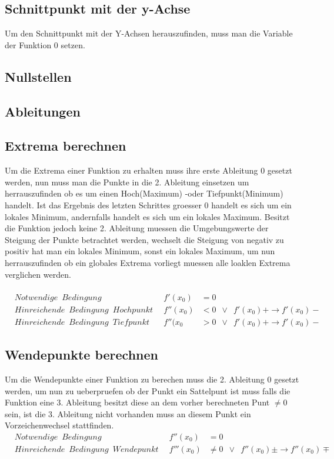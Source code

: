 \documentclass[a4paper]{article} %
\begin{document}

	\subsection{Schnittpunkt mit der y-Achse}
	Um den Schnittpunkt mit der Y-Achsen herauszufinden, muss man die Variable der Funktion 0 setzen.
	\subsection{Nullstellen}
	\subsection{Ableitungen}
	\subsection{Extrema berechnen}
	Um die Extrema einer Funktion zu erhalten muss ihre erste Ableitung $0$ gesetzt werden, nun muss man die Punkte in die 2. Ableitung 
	einsetzen um herrauszufinden ob es um einen Hoch(Maximum) -oder Tiefpunkt(Minimum) handelt. Ist das Ergebnis des letzten Schrittes groesser 0
	handelt es sich um ein lokales Minimum, andernfalls handelt es sich um ein lokales Maximum. Besitzt die Funktion jedoch keine 2. Ableitung muessen die Umgebungswerte der Steigung der Punkte betrachtet werden, wechselt die Steigung von negativ zu positiv hat man ein lokales  Minimum, sonst ein lokales Maximum, um nun herrauszufinden ob ein globales Extrema vorliegt muessen alle loaklen Extrema verglichen werden.\\\\
	\begin{align*}
		&Notwendige\enspace Bedingung\enspace &f'(x_0)&=0\\
		&Hinreichende\enspace Bedingung\enspace Hochpunkt\enspace &f''(x_0)&<0\enspace \lor \enspace f'(x_0)+\rightarrow f'(x_0)- \\
		&Hinreichende\enspace Bedingung\enspace Tiefpunkt\enspace &f''(x_0&>0\enspace \lor \enspace f'(x_0)+\rightarrow f'(x_0)-
	\end{align*}


	\subsection{Wendepunkte berechnen}
	Um die Wendepunkte einer Funktion zu berechen muss die 2. Ableitung 0 gesetzt werden, um nun zu ueberpruefen ob der Punkt ein Sattelpunt ist muss falls die Funktion eine 3. Ableitung besitzt diese an dem vorher berechneten Punt $\neq 0$ sein, ist die 3. Ableitung nicht vorhanden muss an diesem Punkt ein Vorzeichenwechsel stattfinden.
	\begin{align*}
		&Notwendige\enspace Bedingung\enspace &f''(x_0)&=0\\
		&Hinreichende\enspace Bedingung\enspace Wendepunkt\enspace &f'''(x_0)& \neq 0\enspace \lor \enspace f''(x_0)\pm\rightarrow f''(x_0)\mp \\
	\end{align*}
	\pagebreak
\end{document}
